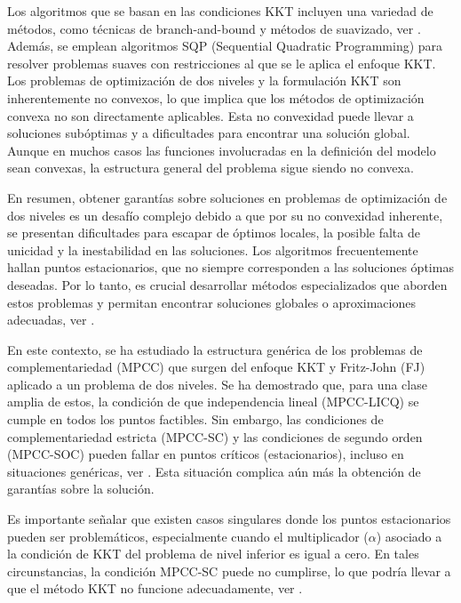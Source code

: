 Los algoritmos que se basan en las condiciones KKT incluyen una variedad de métodos, como técnicas de branch-and-bound y métodos de suavizado, ver \cite{DempeyZemkoho2020}. 
Además, se emplean algoritmos SQP (Sequential Quadratic Programming) para resolver problemas suaves con restricciones al que se le aplica el enfoque KKT.  
Los problemas de optimización de dos niveles y la formulación KKT son inherentemente no convexos, lo que implica que los métodos de optimización convexa no son directamente aplicables. Esta no convexidad puede llevar a soluciones subóptimas y a dificultades para encontrar una solución global. 
Aunque en muchos casos las funciones involucradas en la definición del modelo sean convexas, la estructura general del problema sigue siendo no convexa.

En resumen, obtener garantías sobre soluciones en problemas de optimización de dos niveles es un desafío complejo debido a que por su no convexidad inherente, se presentan dificultades para escapar de óptimos locales, la posible falta de unicidad y la inestabilidad en las soluciones. Los algoritmos frecuentemente hallan puntos estacionarios, que no siempre corresponden a las soluciones óptimas deseadas. Por lo tanto, es crucial desarrollar métodos especializados que aborden estos problemas y permitan encontrar soluciones globales o aproximaciones adecuadas, ver \cite{DempeyZemkoho2020}.

En este contexto, se ha estudiado la estructura genérica de los problemas de complementariedad (MPCC) que surgen del enfoque KKT y Fritz-John (FJ) aplicado a un problema de dos niveles. Se ha demostrado que, para una clase amplia de estos, la condición de que independencia lineal (MPCC-LICQ) se cumple en todos los puntos factibles. Sin embargo, las condiciones de complementariedad estricta (MPCC-SC) y las condiciones de segundo orden (MPCC-SOC) pueden fallar en puntos críticos (estacionarios), incluso en situaciones genéricas, ver \cite{Allende2012SolvingBP}. Esta situación complica aún más la obtención de garantías sobre la solución.

Es importante señalar que existen casos singulares donde los puntos estacionarios pueden ser problemáticos, especialmente cuando el multiplicador (\(\alpha\)) asociado a la condición de KKT del problema de nivel inferior es igual a cero. En tales circunstancias, la condición MPCC-SC puede no cumplirse, lo que podría llevar a que el método KKT no funcione adecuadamente, ver \cite{Allende2012SolvingBP}.

